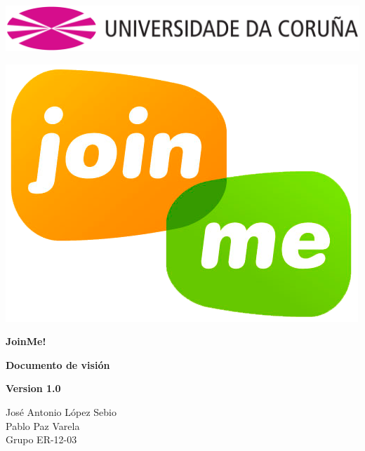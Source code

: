 \documentclass[12pt, a4paper, titlepage]{article}
\begin{document}

\begin{titlepage}

\includegraphics[width=15cm]{Imagenes/Simbolo_logo_UDC.png}

\vspace{3cm}

\begin{center}
\includegraphics[scale=0.3]{Imagenes/1a_Practica_ER_14-15.png}
\end{center}

\begin{flushright}
	
	\LARGE{\textbf{ JoinMe!}}
	
	\LARGE{\textbf{Documento de visión}}
	
	\large{\textbf{Version 1.0}}
\end{flushright}
\vspace{1cm}
\begin{center}
José Antonio López Sebio\\
Pablo Paz Varela\\
Grupo ER-12-03\\
\end{center}



\end{titlepage}
\end{document}
